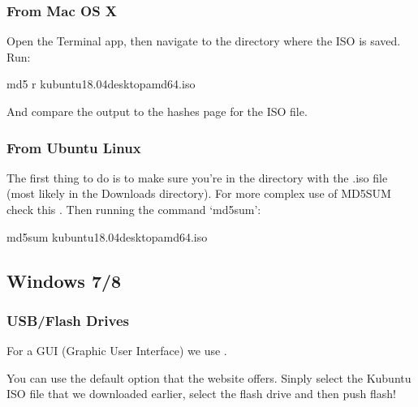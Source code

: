 \documentclass[letterpaper,10pt,english]{sphinxmanual}
\begin{document}
\subsubsection{From Mac OS X}
\label{\detokenize{docs/installation:from-mac-os-x}}
Open the Terminal app, then navigate to the directory where the ISO is saved.
Run:

\begin{sphinxVerbatim}[commandchars=\\\{\}]
md5 \PYGZhy{}r kubuntu\PYGZhy{}18.04\PYGZhy{}desktop\PYGZhy{}amd64.iso
\end{sphinxVerbatim}

And compare the output to the hashes page for the ISO file.


\subsubsection{From Ubuntu Linux}
\label{\detokenize{docs/installation:from-ubuntu-linux}}
The first thing to do is to make sure you’re in the directory with the .iso file (most likely in the Downloads directory). For more complex use of MD5SUM check this . Then running the command ‘md5sum’:

\begin{sphinxVerbatim}[commandchars=\\\{\}]
md5sum kubuntu\PYGZhy{}18.04\PYGZhy{}desktop\PYGZhy{}amd64.iso
\end{sphinxVerbatim}


\subsection{Windows 7/8}
\label{\detokenize{docs/installation:windows-7-8}}

\subsubsection{USB/Flash Drives}
\label{\detokenize{docs/installation:usb-flash-drives}}\label{\detokenize{docs/installation:usb-drives-link}}
For a GUI (Graphic User Interface) we use .

You can use the default option that the website offers. Sinply select the Kubuntu ISO file  that we downloaded earlier, select the flash drive and then push flash!

\end{document}
